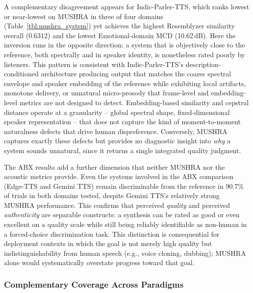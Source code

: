\documentclass[a4paper,fleqn]{cas-dc}
\begin{document}
    \hspace*{1.2em} A complementary disagreement appears for Indic-Parler-TTS, which ranks lowest or near-lowest on MUSHRA in three of four domains
    (Table~\ref{tbl:mushra_system}) yet achieves the highest Resemblyzer
    similarity overall (0.6312) and the lowest Emotional-domain MCD
    (10.62\,dB). Here the inversion runs in the opposite direction: a system
    that is objectively close to the reference, both spectrally and in speaker
    identity, is nonetheless rated poorly by listeners. This pattern is
    consistent with Indic-Parler-TTS's description-conditioned architecture
    producing output that matches the coarse spectral envelope and speaker
    embedding of the reference while exhibiting local artifacts, monotone
    delivery, or unnatural micro-prosody that frame-level and embedding-level
    metrics are not designed to detect. Embedding-based similarity and
    cepstral distance operate at a granularity -- global spectral shape,
    fixed-dimensional speaker representation -- that does not capture the kind
    of moment-to-moment naturalness defects that drive human dispreference.
    Conversely, MUSHRA captures exactly these defects but provides no
    diagnostic insight into \textit{why} a system sounds unnatural, since it
    returns a single integrated quality judgment.
    
    \hspace*{1.1em} The ABX results add a further dimension that neither MUSHRA nor the acoustic metrics provide. Even the systems involved in the ABX comparison (Edge-TTS and Gemini TTS) remain discriminable from the reference in 90.7\% of trials in both domains tested, despite Gemini TTS's relatively strong MUSHRA performance. This confirms that perceived \textit{quality} and
    perceived \textit{authenticity} are separable constructs: a synthesis can
    be rated as good or even excellent on a quality scale while still being
    reliably identifiable as non-human in a forced-choice discrimination task.
    This distinction is consequential for deployment contexts in which the
    goal is not merely high quality but indistinguishability from human speech
    (e.g., voice cloning, dubbing); MUSHRA alone would systematically overstate
    progress toward that goal.
    
    \subsubsection{Complementary Coverage Across Paradigms}
    
\end{document}
